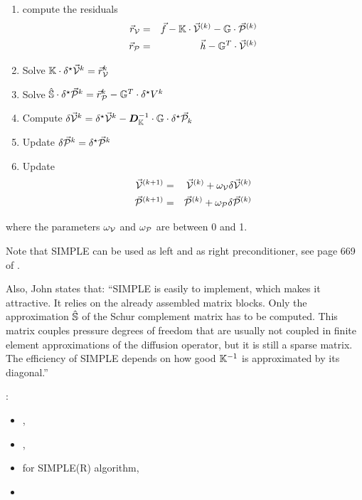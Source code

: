 \begin{mdframed}[backgroundcolor=blue!5]
\begin{enumerate}
\item compute the residuals 
\begin{eqnarray}
\vec{r}_{\cal V} &=& \vec{f} - {\mathbb{K}} \cdot \vec{\cal V}^{(k)} - {\mathbb{G}} \cdot \vec{\cal P}^{(k)} \nonumber\\
\vec{r}_{\cal P} &=& \vec{h} - {\mathbb{G}}^T \cdot \vec{\cal V}^{(k)}
\end{eqnarray}
\item Solve ${\mathbb{K}}  \cdot \delta^\star \vec{\cal V}^k =  \vec{r}_{\cal V}^k  $
\item Solve $\hat{{\mathbb{S}}} \cdot \delta^\star \vec{\cal P}^k =  \vec{r}_{\cal P}^k - {\mathbb{G}}^T \cdot  \delta^\star V^k $
\item Compute $\delta \vec{\cal V}^k = \delta^\star \vec{\cal V}^k -{\bm D}_{\mathbb{K}}^{-1} \cdot {\mathbb{G}} \cdot \delta^\star \vec{\cal P}_k $
\item Update $\delta \vec{\cal P}^k = \delta^\star \vec{\cal P}^k$
\item Update 
\begin{eqnarray}
\vec{\cal V}^{(k+1)} &=& \vec{\cal V}^{(k)} + \omega_{\cal V} \delta \vec{\cal V}^{(k)} \nonumber\\
\vec{\cal P}^{(k+1)} &=& \vec{\cal P}^{(k)} + \omega_{\cal P} \delta \vec{\cal P}^{(k)} 
\end{eqnarray}
\end{enumerate}
\end{mdframed}
where the parameters $\omega_{\cal V}$ and $\omega_{\cal P}$ are between 0 and 1. 

Note that SIMPLE can be used as left and as right preconditioner, see page 669 of \textcite{john16}.

Also, John states that:
``SIMPLE is easily to implement, which makes
it attractive. It relies on the already assembled matrix blocks. Only the approximation 
$\hat{{\mathbb{S}}}$ of the Schur complement matrix has to be computed. This
matrix couples pressure degrees of freedom that are usually not coupled in finite
element approximations of the diffusion operator, but it is still a sparse matrix.
The efficiency of SIMPLE depends on how good ${\mathbb{K}}^{-1}$ is approximated by its
diagonal.''

\vspace{.5cm}

\Literature: 
\begin{itemize}
\item {}, 
\item {}, 
\item {} for SIMPLE(R) algorithm, 
\item {}
\end{itemize}




